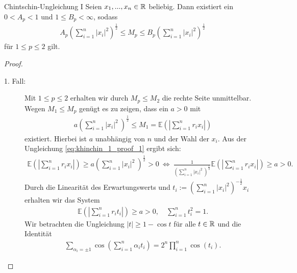 \begin{genericthm}{Chintschin-Ungleichung I}\label{th:khinchin_ineq_1}
	Seien $ x_1,...,x_n \in \mathbb{R} $ beliebig. Dann existiert ein $ 0 < A_p < 1 $ und $ 1 \leq B_p < \infty $, sodass
	\begin{align*}
		A_p 
		\left(
		\sum \limits_{i = 1}^n | x_i|^2		
		\right)^\frac{1}{2}
		\leq 
		M_p
		\leq
		B_p 
		\left(
		\sum \limits_{i = 1}^n | x_i|^2		
		\right)^\frac{1}{2}
	\end{align*}
	für $ 1 \leq p \leq 2 $ gilt.  
\end{genericthm}
\begin{proof}
	\begin{description}
		\item[1. Fall:   ]
		Mit $ 1 \leq p \leq 2 $ erhalten wir durch $ M_p \leq M_2 $ die rechte Seite unmittelbar.
		Wegen $ M_1 \leq M_p $ genügt es zu zeigen, dass ein $ a > 0 $ mit
		\begin{align}\label{eq:khinchin_1_proof_1}
			a 
			\left(
			\sum \limits_{i = 1}^n | x_i |^2 \ 
			\right)^\frac{1}{2}
			\leq M_1 
			=
			\mathbb{E}
			\left(\left|
			\sum \limits_{i = 1}^n  r_i x_i
			\right|\right)
		\end{align}
		existiert. Hierbei ist $ a $ unabhängig von $ n $ und der Wahl der $ x_i $. 
		Aus der Ungleichung \eqref{eq:khinchin_1_proof_1} ergibt sich:
		\begin{align*}
			\mathbb{E}
			\left(\left|
			\sum \limits_{i = 1}^n  r_i x_i
			\right|\right)
			\geq 
			a 
			\left(
			\sum \limits_{i = 1}^n | x_i |^2 \ 
			\right)^\frac{1}{2} > 0
			\ \Leftrightarrow \
			\frac{1}{\left(\sum \limits_{i = 1}^n | x_i |^2 \ \right)^\frac{1}{2}}
			\mathbb{E}
			\left(\left|
			\sum \limits_{i = 1}^n  r_i x_i
			\right|\right)
			\geq a > 0.
		\end{align*}
		Durch die Linearität des Erwartungswerts und  $ t_i := \left(\sum_{i = 1}^n |x_i|^2\right)^{-\frac{1}{2}} x_i $ erhalten wir das System
		\begin{align}\label{eq:khinchin_1_proof_2}
			\mathbb{E}
			\left(\left|
			\sum \limits_{i = 1}^n  r_i t_i
			\right|\right) 
			\geq  a > 0, \quad
			\sum \limits_{i = 1}^n t_i^2 = 1.
		\end{align}
		Wir betrachten die Ungleichung $ |t | \geq 1- \cos t $ für alle $ t \in \mathbb{R} $ und die Identität
		\begin{align*}
			\sum \limits_{\alpha_i = \pm 1} 
			\cos \left(
			\sum \limits_{i = 1}^n \alpha_i t_i
			\right) 
			=
			2^n \prod \limits_{i = 1}^n \cos(t_i).
		\end{align*}

\end{description}
\end{proof}
